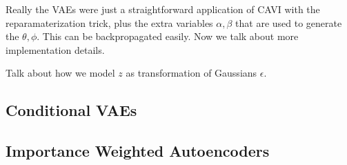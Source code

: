   Really the VAEs were just a straightforward application of CAVI with the reparamaterization trick, plus the extra variables $\alpha, \beta$ that are used to generate the $\theta, \phi$. This can be backpropagated easily. Now we talk about more implementation details. 

  Talk about how we model $z$ as transformation of Gaussians $\epsilon$. 

\subsection{Conditional VAEs}

\subsection{Importance Weighted Autoencoders}

